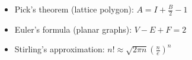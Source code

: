 \begin{itemize}
  \item Pick’s theorem (lattice polygon): $A = I + \frac{B}{2} - 1$
  \item Euler’s formula (planar graphs): $V - E + F = 2$
  \item Stirling’s approximation: $n! \approx \sqrt{2\pi n}\left(\frac{n}{e}\right)^n$
\end{itemize}
